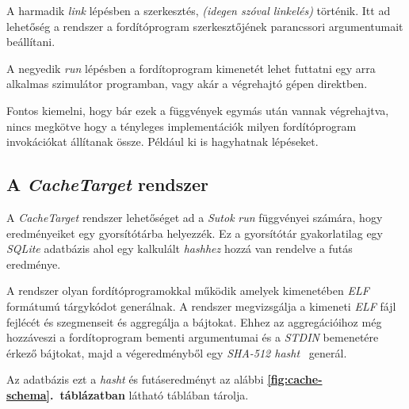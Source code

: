         A harmadik \textit{link} lépésben a szerkesztés, \textit{(idegen szóval linkelés)} történik. Itt ad lehetőség a
        rendszer a fordítóprogram szerkesztőjének parancssori argumentumait beállítani.

        A negyedik \textit{run} lépésben a fordítoprogram kimenetét lehet futtatni egy arra alkalmas szimulátor
        programban, vagy akár a végrehajtó gépen direktben.

        Fontos kiemelni, hogy bár ezek a függvények egymás után vannak végrehajtva, nincs megkötve hogy a tényleges
        implementációk milyen fordítóprogram invokációkat állítanak össze. Például ki is hagyhatnak lépéseket.

    \subsection{A \textit{CacheTarget} rendszer}

        A \textit{CacheTarget} rendszer lehetőséget ad a \textit{Sutok} \textit{run} függvényei számára, hogy
        eredményeiket egy gyorsítótárba helyezzék. Ez a gyorsítótár gyakorlatilag egy \textit{SQLite} adatbázis ahol
        egy kalkulált \textit{hashhez} hozzá van rendelve a futás eredménye.

        A rendszer olyan fordítóprogramokkal működik amelyek kimenetében \textit{ELF} formátumú tárgykódot generálnak.
        A rendszer megvizsgálja a kimeneti \textit{ELF} fájl fejlécét és szegmenseit és aggregálja a bájtokat. Ehhez az
        aggregációihoz még hozzáveszi a fordítoprogram bementi argumentumai és a \textit{STDIN} bemenetére érkező
        bájtokat, majd a végeredményből egy \textit{SHA-512 hasht}~\cite{sha512} generál.

        Az adatbázis ezt a \textit{hasht} és futáseredményt az alábbi \textbf{\ref{fig:cache-schema}.\ táblázatban}
        látható táblában tárolja.

